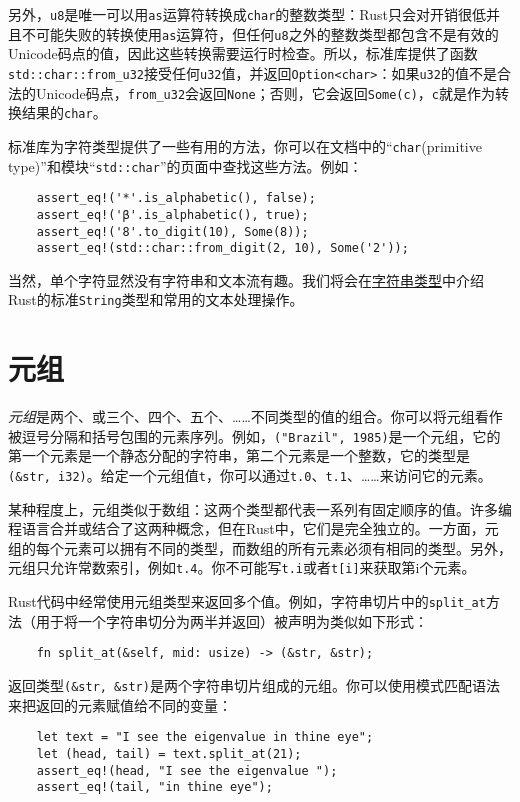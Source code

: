 另外，\texttt{u8}是唯一可以用\texttt{as}运算符转换成\texttt{char}的整数类型：Rust只会对开销很低并且不可能失败的转换使用\texttt{as}运算符，但任何\texttt{u8}之外的整数类型都包含不是有效的Unicode码点的值，因此这些转换需要运行时检查。所以，标准库提供了函数\texttt{std::char::from\_u32}接受任何\texttt{u32}值，并返回\texttt{Option<char>}：如果\texttt{u32}的值不是合法的Unicode码点，\texttt{from\_u32}会返回\texttt{None}；否则，它会返回\texttt{Some(c)}，\texttt{c}就是作为转换结果的\texttt{char}。

标准库为字符类型提供了一些有用的方法，你可以在文档中的“\texttt{char}(primitive type)”和模块“\texttt{std::char}”的页面中查找这些方法。例如：
\begin{verbatim}
    assert_eq!('*'.is_alphabetic(), false);
    assert_eq!('β'.is_alphabetic(), true);
    assert_eq!('8'.to_digit(10), Some(8));
    assert_eq!(std::char::from_digit(2, 10), Some('2'));
\end{verbatim}

当然，单个字符显然没有字符串和文本流有趣。我们将会在\hyperref[string]{字符串类型}中介绍Rust的标准\texttt{String}类型和常用的文本处理操作。

\section{元组}
\emph{元组}是两个、或三个、四个、五个、……不同类型的值的组合。你可以将元组看作被逗号分隔和括号包围的元素序列。例如，\texttt{("Brazil", 1985)}是一个元组，它的第一个元素是一个静态分配的字符串，第二个元素是一个整数，它的类型是\texttt{(\&str, i32)}。给定一个元组值\texttt{t}，你可以通过\texttt{t.0}、\texttt{t.1}、……来访问它的元素。

某种程度上，元组类似于数组：这两个类型都代表一系列有固定顺序的值。许多编程语言合并或结合了这两种概念，但在Rust中，它们是完全独立的。一方面，元组的每个元素可以拥有不同的类型，而数组的所有元素必须有相同的类型。另外，元组只允许常数索引，例如\texttt{t.4}。你不可能写\texttt{t.i}或者\texttt{t[i]}来获取第i个元素。

Rust代码中经常使用元组类型来返回多个值。例如，字符串切片中的\texttt{split\_at}方法（用于将一个字符串切分为两半并返回）被声明为类似如下形式：
\begin{verbatim}
    fn split_at(&self, mid: usize) -> (&str, &str);
\end{verbatim}

返回类型\texttt{(\&str, \&str)}是两个字符串切片组成的元组。你可以使用模式匹配语法来把返回的元素赋值给不同的变量：
\begin{verbatim}
    let text = "I see the eigenvalue in thine eye";
    let (head, tail) = text.split_at(21);
    assert_eq!(head, "I see the eigenvalue ");
    assert_eq!(tail, "in thine eye");
\end{verbatim}

